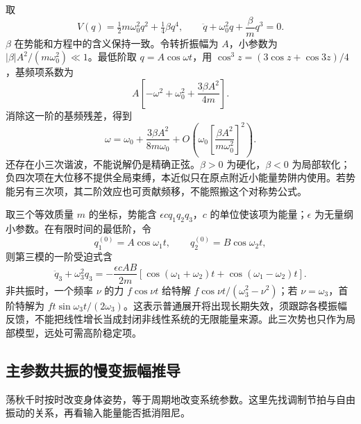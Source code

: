 \begin{example}[对称四次势能的首阶频移]
取
\[
V(q)=\tfrac12m\omega_0^2q^2+\tfrac14\beta q^4,\qquad
\ddot q+\omega_0^2q+\frac\beta m q^3=0.
\]
$\beta$ 在势能和方程中的含义保持一致。令转折振幅为 $A$，小参数为 $|\beta|A^2/(m\omega_0^2)\ll1$。最低阶取 $q=A\cos\omega t$，用 $\cos^3z=(3\cos z+\cos3z)/4$，基频项系数为
\[
A\left[-\omega^2+\omega_0^2+\frac{3\beta A^2}{4m}\right].
\]
消除这一阶的基频残差，得到
\begin{equation}
\omega=\omega_0+\frac{3\beta A^2}{8m\omega_0}
+O\left(\omega_0\left[\frac{\beta A^2}{m\omega_0^2}\right]^2\right).
\label{eq:osc-duffing-shift}
\end{equation}
还存在小三次谐波，不能说解仍是精确正弦。$\beta>0$ 为硬化，$\beta<0$ 为局部软化；负四次项在大位移不提供全局束缚，本近似只在原点附近小能量势阱内使用。若势能另有三次项，其二阶效应也可贡献频移，不能照搬这个对称势公式。
\end{example}

\begin{example}[从明确的耦合势产生和频、差频]
取三个等效质量 $m$ 的坐标，势能含 $\epsilon c q_1q_2q_3$，$c$ 的单位使该项为能量；$\epsilon$ 为无量纲小参数。在有限时间的最低阶，令
\[
q_1^{(0)}=A\cos\omega_1t,\qquad q_2^{(0)}=B\cos\omega_2t,
\]
则第三模的一阶受迫式含
\[
\ddot q_3+\omega_3^2q_3
=-\frac{\epsilon c AB}{2m}
[\cos(\omega_1+\omega_2)t+\cos(\omega_1-\omega_2)t].
\]
非共振时，一个频率 $\nu$ 的力 $f\cos\nu t$ 给特解 $f\cos\nu t/(\omega_3^2-\nu^2)$；若 $\nu=\omega_3$，首阶特解为 $ft\sin\omega_3t/(2\omega_3)$。这表示普通展开将出现长期失效，须跟踪各模振幅反馈，不能把线性增长当成封闭非线性系统的无限能量来源。此三次势也只作为局部模型，远处可需高阶稳定项。
\end{example}

\subsection{主参数共振的慢变振幅推导}
荡秋千时按时改变身体姿势，等于周期地改变系统参数。这里先找调制节拍与自由振动的关系，再看输入能量能否抵消阻尼。

